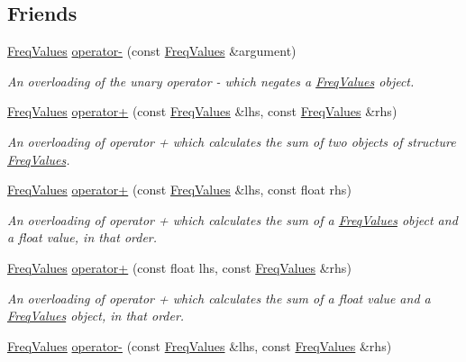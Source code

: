 \subsection*{Friends}
\begin{DoxyCompactItemize}
\item 
\hyperlink{structFreqValues}{Freq\+Values} \hyperlink{structFreqValues_af2d38eb1ad1d3c6dfab8b4ea399c867d}{operator-\/} (const \hyperlink{structFreqValues}{Freq\+Values} \&argument)
\begin{DoxyCompactList}\small\item\em An overloading of the unary operator -\/ which negates a {\itshape \hyperlink{structFreqValues}{Freq\+Values}} object. \end{DoxyCompactList}\item 
\hyperlink{structFreqValues}{Freq\+Values} \hyperlink{structFreqValues_aa27b2370e9b314e6e0f308f4efb39a2f}{operator+} (const \hyperlink{structFreqValues}{Freq\+Values} \&lhs, const \hyperlink{structFreqValues}{Freq\+Values} \&rhs)
\begin{DoxyCompactList}\small\item\em An overloading of operator + which calculates the sum of two objects of structure {\itshape \hyperlink{structFreqValues}{Freq\+Values}}. \end{DoxyCompactList}\item 
\hyperlink{structFreqValues}{Freq\+Values} \hyperlink{structFreqValues_afa29d8e6cf56d1c724c712bcc95c0e4b}{operator+} (const \hyperlink{structFreqValues}{Freq\+Values} \&lhs, const float rhs)
\begin{DoxyCompactList}\small\item\em An overloading of operator + which calculates the sum of a {\itshape \hyperlink{structFreqValues}{Freq\+Values}} object and a {\itshape float} value, in that order. \end{DoxyCompactList}\item 
\hyperlink{structFreqValues}{Freq\+Values} \hyperlink{structFreqValues_add1a78bbae864d4a24ac7b491ae41b2e}{operator+} (const float lhs, const \hyperlink{structFreqValues}{Freq\+Values} \&rhs)
\begin{DoxyCompactList}\small\item\em An overloading of operator + which calculates the sum of a {\itshape float} value and a {\itshape \hyperlink{structFreqValues}{Freq\+Values}} object, in that order. \end{DoxyCompactList}\item 
\hyperlink{structFreqValues}{Freq\+Values} \hyperlink{structFreqValues_a05184c79e4dadc7a4e1f3a76fba1c3c8}{operator-\/} (const \hyperlink{structFreqValues}{Freq\+Values} \&lhs, const \hyperlink{structFreqValues}{Freq\+Values} \&rhs)

\end{DoxyCompactItemize}
